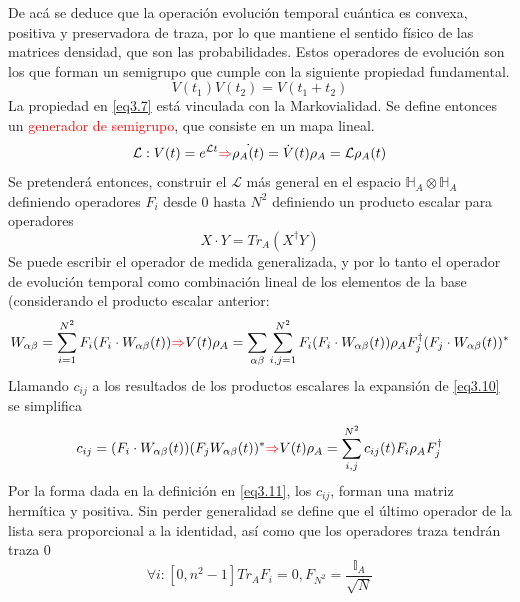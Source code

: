 \documentclass{book}
\begin{document}
De acá se deduce que la operación evolución temporal cuántica es convexa, positiva y preservadora de traza, por lo que mantiene el sentido físico de las matrices densidad, que son las probabilidades. Estos operadores de evolución son los que forman un semigrupo que cumple con la siguiente propiedad fundamental.
\begin{equation}\label{eq3.7}V(t_1)V(t_2)=V(t_1+t_2) \end{equation}
La propiedad en \textcolor{blue}{\ref{eq3.7}} está vinculada con la Markovialidad.
Se define entonces un \textcolor{Red}{generador de semigrupo}, que consiste en un mapa lineal.
\begin{equation}\label{eq3.8}\mathcal{L}:V(t)=e^{\mathcal{L}t}\textcolor{red}{\Rightarrow} \dot{\rho_A(t)}=\dot{V}(t)\rho_A=\mathcal{L}\rho_A(t)\end{equation}
Se pretenderá entonces, construir el $\mathcal{L}$ más general en el espacio $\mathbb{H}_A\otimes\mathbb{H}_A$ definiendo operadores $F_i$ desde $0$ hasta $N^2$ definiendo un producto escalar para operadores
\begin{equation}\label{eq3.9}  X\cdot Y=Tr_A(X^\dag Y)\end{equation}
Se puede escribir el operador de medida generalizada, y por lo tanto el operador de evolución temporal como combinación lineal de los elementos de la base (considerando el producto escalar anterior:
\begin{equation}\label{eq3.10}W_{\alpha\beta}=\sum_{i=1}^{N^2} F_i(F_i\cdot W_{\alpha\beta}(t))\textcolor{red}{\Rightarrow} V(t)\rho_A=\sum_{\alpha\beta}\sum_{i,j=1}^{N^2} F_i(F_i\cdot W_{\alpha\beta}(t))\rho_AF_j^\dag(F_j\cdot W_{\alpha\beta}(t))^*\end{equation}
Llamando $c_{ij}$ a los resultados de los productos escalares la expansión de \textcolor{blue}{\ref{eq3.10}} se simplifica
\begin{equation}\label{eq3.11}c_{ij}=(F_i\cdot W_{\alpha\beta}(t))(F_j W_{\alpha\beta}(t))^*\textcolor{red}{\Rightarrow} V(t)\rho_A=\sum_{i,j}^{N^2}c_{ij}(t)F_i\rho_AF_j^\dag\end{equation}
Por la forma dada en la definición en \textcolor{blue}{\ref{eq3.11}}, los $c_{ij}$, forman una matriz hermítica y positiva.
Sin perder generalidad se define que el último operador de la lista sera proporcional a la identidad, así como que los operadores traza tendrán traza $0$
\begin{equation}\label{eq3.12}\forall i:[0,n^2-1] Tr_A F_i=0, F_{N^2}=\frac{\mathbb{I}_A}{\sqrt{N}}\end{equation}
\end{document}
